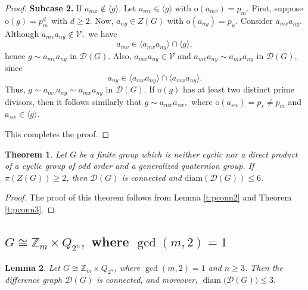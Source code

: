 \documentclass[12pt]{amsart}
\theoremstyle{plain}
\newtheorem{theorem}{Theorem}[section]
\newtheorem{lemma}[theorem]{Lemma}
\theoremstyle{remark}
\theoremstyle{definition}
\begin{document}
\begin{proof}
\smallskip
\textbf{Subcase 2.} If $a_{mx} \notin \langle g \rangle.$  
Let $a_{mv} \in \langle g \rangle$ with $\mathrm{o}(a_{mv}) = p_m.$ First, suppose $\mathrm{o}(g) = p_m^d$ with $d \geq 2.$  
Now, $a_{ny} \in Z(G)$ with $\mathrm{o}(a_{ny}) = p_n.$  
Consider $a_{mv}a_{ny}.$  
Although $a_{mv}a_{ny} \notin \mathcal{V},$ we have
\[
a_{mv} \in \langle a_{mv}a_{ny} \rangle \cap \langle g \rangle,
\]
hence $g \sim a_{mv}a_{ny}$ in $\mathcal{D}(G).$  
Also, $a_{mx}a_{ny} \in \mathcal{V}$ and $a_{mv}a_{ny} \sim a_{mx}a_{ny}$ in $\mathcal{D}(G),$ since 
\[
a_{ny} \in \langle a_{mv}a_{ny} \rangle \cap \langle a_{mx}a_{ny} \rangle.
\]
Thus, $g \sim a_{mv}a_{ny} \sim a_{mx}a_{ny}$ in $\mathcal{D}(G).$ If $\mathrm{o}(g)$ has at least two distinct prime divisors, then it follows similarly that $g \sim a_{mx}a_{sw},$ where $\mathrm{o}(a_{sw}) = p_s \neq p_m$ and $a_{sw} \in \langle g \rangle.$  

\medskip
This completes the proof.  
\end{proof}

\begin{theorem}\label{t:conn2}
Let $G$ be a finite group which is neither cyclic nor a direct product of a cyclic group of odd order and a generalized quaternion group. If $\pi(Z(G))\geq 2$, then $\mathcal{D}(G)$ is connected and $\text{diam}(\mathcal{D}(G))\leq 6$. 
\end{theorem}
\begin{proof}
The proof of this theorem follows from Lemma \ref{t:pconn2} and Theorem \ref{t:pconn3}. 
\end{proof}



\subsection{$G\cong \mathbb{Z}_m\times Q_{2^n},$ where $\gcd(m, 2)=1$}

\begin{lemma}\label{t:cxq_conn}
Let \(G \cong \mathbb{Z}_m \times Q_{2^n}\), where \(\gcd(m,2)=1\) and \(n \ge 3\). Then the difference graph \(\mathcal{D}(G)\) is connected, and moreover,
$\operatorname{diam}\bigl(\mathcal{D}(G)\bigr) \le 3.$

\end{lemma}
\end{document}
